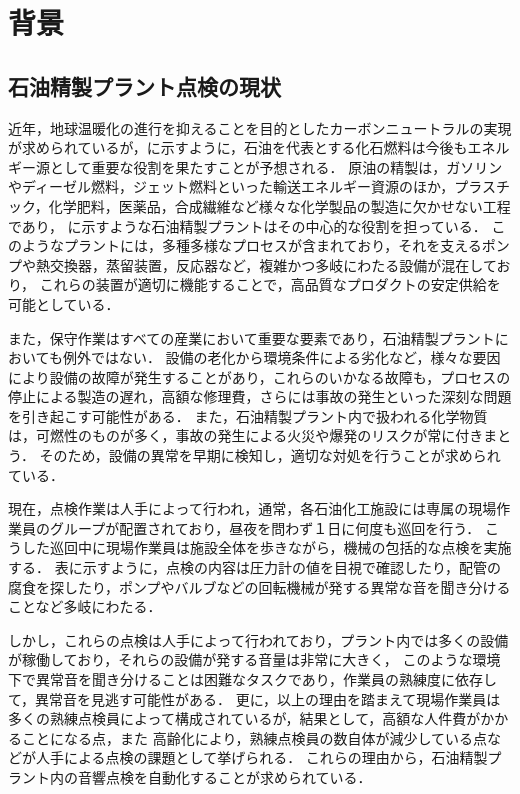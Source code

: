 \documentclass[../main]{subfiles}
\begin{document}

\section{背景}
\label{sec:intro_background}
\subsection{石油精製プラント点検の現状}
\label{sec:intro_plant_current}
近年，地球温暖化の進行を抑えることを目的としたカーボンニュートラルの実現が求められているが，に示すように，石油を代表とする化石燃料は今後もエネルギー源として重要な役割を果たすことが予想される．\cite{ritchie2023energy}
原油の精製は，ガソリンやディーゼル燃料，ジェット燃料といった輸送エネルギー資源のほか，プラスチック，化学肥料，医薬品，合成繊維など様々な化学製品の製造に欠かせない工程であり，
に示すような石油精製プラントはその中心的な役割を担っている．\cite{eneos2024}
このようなプラントには，多種多様なプロセスが含まれており，それを支えるポンプ\cite{Shvindin2008A}や熱交換器\cite{Abbasov2023PRIMARY}，蒸留装置，反応器など，複雑かつ多岐にわたる設備が混在しており，
これらの装置が適切に機能することで，高品質なプロダクトの安定供給を可能としている．


また，保守作業はすべての産業において重要な要素であり，石油精製プラントにおいても例外ではない．
設備の老化から環境条件による劣化など，様々な要因により設備の故障が発生することがあり，これらのいかなる故障も，プロセスの停止による製造の遅れ，高額な修理費，さらには事故の発生といった深刻な問題を引き起こす可能性がある．
また，石油精製プラント内で扱われる化学物質は，可燃性のものが多く，事故の発生による火災や爆発のリスクが常に付きまとう．\cite{Tang2021}
そのため，設備の異常を早期に検知し，適切な対処を行うことが求められている．

現在，点検作業は人手によって行われ，通常，各石油化工施設には専属の現場作業員のグループが配置されており，昼夜を問わず１日に何度も巡回を行う．
こうした巡回中に現場作業員は施設全体を歩きながら，機械の包括的な点検を実施する．
表に示すように，点検の内容は圧力計の値を目視で確認したり，配管の腐食を探したり，ポンプやバルブなどの回転機械が発する異常な音を聞き分けることなど多岐にわたる．

しかし，これらの点検は人手によって行われており，プラント内では多くの設備が稼働しており，それらの設備が発する音量は非常に大きく，
このような環境下で異常音を聞き分けることは困難なタスクであり，作業員の熟練度に依存して，異常音を見逃す可能性がある．
更に，以上の理由を踏まえて現場作業員は多くの熟練点検員によって構成されているが，結果として，高額な人件費がかかることになる点，また
高齢化により，熟練点検員の数自体が減少している点などが人手による点検の課題として挙げられる．
これらの理由から，石油精製プラント内の音響点検を自動化することが求められている．
\end{document}
